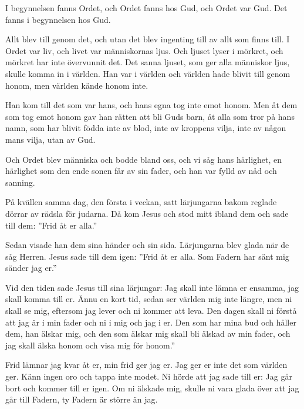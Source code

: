 {I begynnelsen fanns Ordet, och Ordet fanns hos Gud, och Ordet var Gud. 
Det fanns i begynnelsen hos Gud. 

Allt blev till genom det, och utan det blev ingenting till av allt som finns till. 
I Ordet var liv, och livet var människornas ljus. 
Och ljuset lyser i mörkret, och mörkret har inte övervunnit det.
Det sanna ljuset, som ger alla människor ljus, skulle komma in i världen. 
Han var i världen och världen hade blivit till genom honom, men världen kände honom inte. 

Han kom till det som var hans, och hans egna tog inte emot honom. 
Men åt dem som tog emot honom gav han rätten att bli Guds barn, åt alla som tror på hans namn, 
som har blivit födda inte av blod, inte av kroppens vilja, inte av någon mans vilja, utan av Gud.

Och Ordet blev människa och bodde bland oss, och vi såg hans härlighet, en härlighet som den ende sonen får av sin fader, och han var fylld av nåd och sanning.}




{På kvällen samma dag, den första i veckan, satt lärjungarna bakom reglade dörrar av rädsla för judarna. Då kom Jesus och stod mitt ibland dem och sade till dem: ”Frid åt er alla.” 

Sedan visade han dem sina händer och sin sida. Lärjungarna blev glada när de såg Herren. 
Jesus sade till dem igen: ”Frid åt er alla. Som Fadern har sänt mig sänder jag er.” }


{Vid den tiden sade Jesus till sina lärjungar: Jag skall inte lämna er ensamma, jag skall komma till er. 
Ännu en kort tid, sedan ser världen mig inte längre, men ni skall se mig, eftersom jag lever och ni kommer att leva. 
Den dagen skall ni förstå att jag är i min fader och ni i mig och jag i er. 
Den som har mina bud och håller dem, han älskar mig, och den som älskar mig skall bli älskad av min fader, och jag skall älska honom och visa mig för honom.” 

Frid lämnar jag kvar åt er, min frid ger jag er. Jag ger er inte det som världen ger. Känn ingen oro och tappa inte modet. 
Ni hörde att jag sade till er: Jag går bort och kommer till er igen. Om ni älskade mig, skulle ni vara glada över att jag går till Fadern, ty Fadern är större än jag. }


